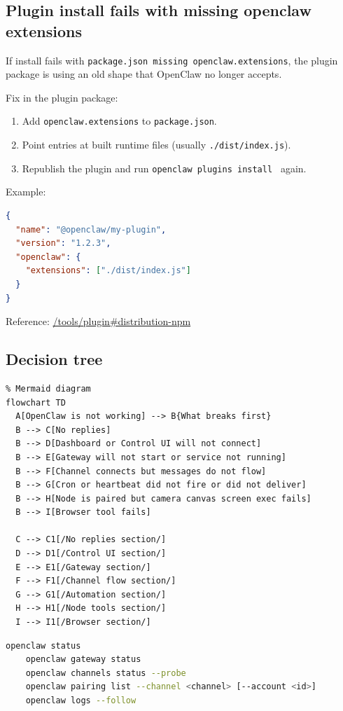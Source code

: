 \subsection{Plugin install fails with missing openclaw extensions}


If install fails with \texttt{package.json missing openclaw.extensions}, the plugin package
is using an old shape that OpenClaw no longer accepts.

Fix in the plugin package:

\begin{enumerate}
  \item Add \texttt{openclaw.extensions} to \texttt{package.json}.
  \item Point entries at built runtime files (usually \texttt{./dist/index.js}).
  \item Republish the plugin and run \texttt{openclaw plugins install } again.
\end{enumerate}


Example:

\begin{lstlisting}[language=json]
{
  "name": "@openclaw/my-plugin",
  "version": "1.2.3",
  "openclaw": {
    "extensions": ["./dist/index.js"]
  }
}
\end{lstlisting}


Reference: \href{/tools/plugin\#distribution-npm}{/tools/plugin\#distribution-npm}

\subsection{Decision tree}


\begin{verbatim}
% Mermaid diagram
flowchart TD
  A[OpenClaw is not working] --> B{What breaks first}
  B --> C[No replies]
  B --> D[Dashboard or Control UI will not connect]
  B --> E[Gateway will not start or service not running]
  B --> F[Channel connects but messages do not flow]
  B --> G[Cron or heartbeat did not fire or did not deliver]
  B --> H[Node is paired but camera canvas screen exec fails]
  B --> I[Browser tool fails]

  C --> C1[/No replies section/]
  D --> D1[/Control UI section/]
  E --> E1[/Gateway section/]
  F --> F1[/Channel flow section/]
  G --> G1[/Automation section/]
  H --> H1[/Node tools section/]
  I --> I1[/Browser section/]
\end{verbatim}


\begin{lstlisting}[language=bash]
    openclaw status
    openclaw gateway status
    openclaw channels status --probe
    openclaw pairing list --channel <channel> [--account <id>]
    openclaw logs --follow
\end{lstlisting}


